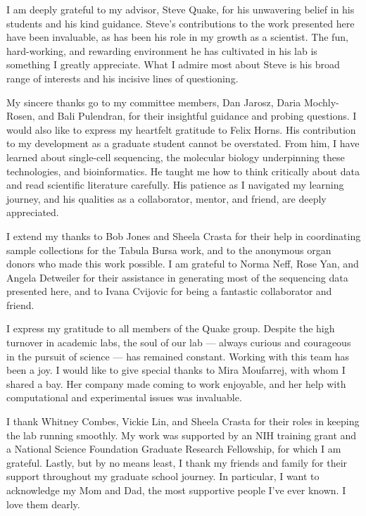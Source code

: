 I am deeply grateful to my advisor, Steve Quake, for his unwavering belief in his students and his kind guidance. Steve's contributions to the work presented here have been invaluable, as has been his role in my growth as a scientist. The fun, hard-working, and rewarding environment he has cultivated in his lab is something I greatly appreciate. What I admire most about Steve is his broad range of interests and his incisive lines of questioning.

My sincere thanks go to my committee members, Dan Jarosz, Daria Mochly-Rosen, and Bali Pulendran, for their insightful guidance and probing questions. I would also like to express my heartfelt gratitude to Felix Horns. His contribution to my development as a graduate student cannot be overstated. From him, I have learned about single-cell sequencing, the molecular biology underpinning these technologies, and bioinformatics. He taught me how to think critically about data and read scientific literature carefully. His patience as I navigated my learning journey, and his qualities as a collaborator, mentor, and friend, are deeply appreciated.

I extend my thanks to Bob Jones and Sheela Crasta for their help in coordinating sample collections for the Tabula Bursa work, and to the anonymous organ donors who made this work possible. I am grateful to Norma Neff, Rose Yan, and Angela Detweiler for their assistance in generating most of the sequencing data presented here, and to Ivana Cvijovic for being a fantastic collaborator and friend.

I express my gratitude to all members of the Quake group. Despite the high turnover in academic labs, the soul of our lab — always curious and courageous in the pursuit of science — has remained constant. Working with this team has been a joy. I would like to give special thanks to Mira Moufarrej, with whom I shared a bay. Her company made coming to work enjoyable, and her help with computational and experimental issues was invaluable.

I thank Whitney Combes, Vickie Lin, and Sheela Crasta for their roles in keeping the lab running smoothly. My work was supported by an NIH training grant and a National Science Foundation Graduate Research Fellowship, for which I am grateful. Lastly, but by no means least, I thank my friends and family for their support throughout my graduate school journey. In particular, I want to acknowledge my Mom and Dad, the most supportive people I've ever known. I love them dearly.